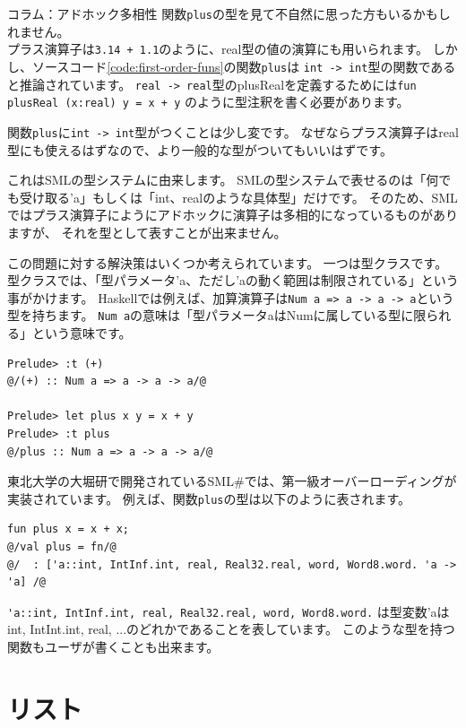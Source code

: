 \documentclass[11pt,a4paper]{article}
\begin{document}
\begin{itembox}[l]{コラム：アドホック多相性}
関数\lstinline{plus}の型を見て不自然に思った方もいるかもしれません。\\
プラス演算子は\lstinline{3.14 + 1.1}のように、real型の値の演算にも用いられます。
しかし、ソースコード\ref{code:first-order-funs}の関数\lstinline{plus}は
\lstinline{int -> int}型の関数であると推論されています。
\lstinline{real -> real}型のplusRealを定義するためには\lstinline{fun plusReal (x:real) y = x + y}
のように型注釈を書く必要があります。

関数\lstinline{plus}に\lstinline{int -> int}型がつくことは少し変です。
なぜならプラス演算子はreal型にも使えるはずなので、より一般的な型がついてもいいはずです。

これはSMLの型システムに由来します。
SMLの型システムで表せるのは「何でも受け取る'a」もしくは「int、realのような具体型」だけです。
そのため、SMLではプラス演算子にようにアドホックに演算子は多相的になっているものがありますが、
それを型として表すことが出来ません。

この問題に対する解決策はいくつか考えられています。
一つは型クラスです。型クラスでは、「型パラメータ'a、ただし'aの動く範囲は制限されている」という事がかけます。
Haskellでは例えば、加算演算子は\lstinline{Num a => a -> a -> a}という型を持ちます。
\lstinline{Num a}の意味は「型パラメータaはNumに属している型に限られる」という意味です。

\begin{lstlisting}[caption=Haskellでのplusの型付け]
Prelude> :t (+)
@/(+) :: Num a => a -> a -> a/@

Prelude> let plus x y = x + y
Prelude> :t plus
@/plus :: Num a => a -> a -> a/@
\end{lstlisting}

東北大学の大堀研で開発されているSML\#\cite{smlsharp}では、第一級オーバーローディングが実装されています。
例えば、関数\lstinline{plus}の型は以下のように表されます。
\begin{lstlisting}[caption=SML\#でのplusの型付け]
fun plus x = x + x;
@/val plus = fn/@
@/  : ['a::int, IntInf.int, real, Real32.real, word, Word8.word. 'a -> 'a] /@
\end{lstlisting}
\lstinline{'a::int, IntInf.int, real, Real32.real, word, Word8.word.}
は型変数'aはint, IntInt.int, real, ...のどれかであることを表しています。
このような型を持つ関数もユーザが書くことも出来ます。

\end{itembox}

\label{sec:list}
\section{リスト}
\end{document}
